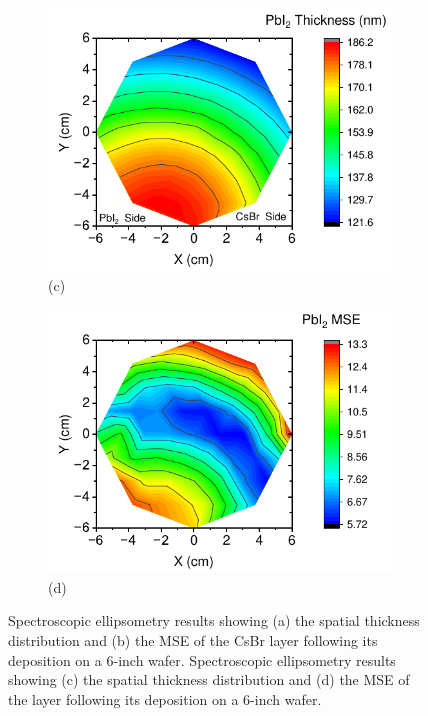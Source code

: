 \begin{figure}[ht!]
    \begin{subfigure}[t]{0.49\textwidth}
        \centering
        \includegraphics[width=\textwidth]{chapters/stability/imeges/PbI2Thickness.pdf} %
        \caption*{(c)}
    \end{subfigure}
    \hfill
    \begin{subfigure}[t]{0.49\textwidth}
        \centering
        \includegraphics[width=\textwidth]{chapters/stability/imeges/PbI2MSE.pdf} %
        \caption*{(d)}
    \end{subfigure}
    \caption[Precursors' spatial thickness profile across a 6'' wafer, when deposited separately without substrate rotation. ]{Spectroscopic ellipsometry results showing (a) the spatial thickness distribution and (b) the MSE of the CsBr layer following its deposition on a 6-inch wafer. Spectroscopic ellipsometry results showing (c) the spatial thickness distribution and (d) the MSE of the  layer following its deposition on a 6-inch wafer.}
    \label{fig:stability:ellipsometry:thickness_mse}
\end{figure}

